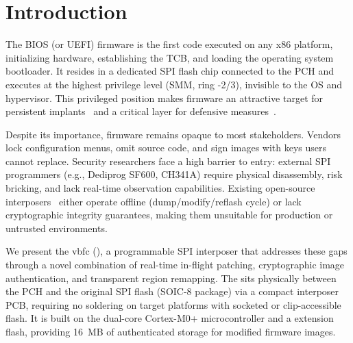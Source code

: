 \section{Introduction}
\label{sec:introduction}

The \ac{BIOS} (or \ac{UEFI}) firmware is the first code executed on any x86 platform, initializing hardware, establishing the \ac{TCB}, and loading the operating system bootloader. It resides in a dedicated \ac{SPI} flash chip connected to the \ac{PCH} and executes at the highest privilege level (\ac{SMM}, ring -2/3), invisible to the OS and hypervisor. This privileged position makes firmware an attractive target for persistent implants~\cite{kallenberg2015firmware, wormley2018bios} and a critical layer for defensive measures~\cite{nist2018sp800-193, microsoft2020secured-core}.

Despite its importance, firmware remains opaque to most stakeholders. Vendors lock configuration menus, omit source code, and sign images with keys users cannot replace. Security researchers face a high barrier to entry: external \ac{SPI} programmers (e.g., Dediprog SF600, CH341A) require physical disassembly, risk bricking, and lack real-time observation capabilities. Existing open-source interposers~\cite{spispy, fspi, spi-flasher} either operate offline (dump/modify/reflash cycle) or lack cryptographic integrity guarantees, making them unsuitable for production or untrusted environments.

We present the \acf{vbfc} (\vbfc), a programmable \ac{SPI} interposer that addresses these gaps through a novel combination of real-time in-flight patching, cryptographic image authentication, and transparent region remapping. The \vbfc sits physically between the \ac{PCH} and the original \ac{SPI} flash (SOIC-8 package) via a compact interposer \ac{PCB}, requiring no soldering on target platforms with socketed or clip-accessible flash. It is built on the \rp dual-core Cortex-M0+ microcontroller and a \wq extension flash, providing \SI{16}{MB} of authenticated storage for modified firmware images.

